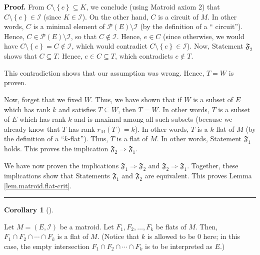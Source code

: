 \documentclass[numbers=enddot,12pt,final,onecolumn,notitlepage]{scrartcl}%
\theoremstyle{definition}
\newtheorem{coro}[theo]{Corollary}
\newenvironment{corollary}[1][]
{\begin{coro}[#1]\begin{leftbar}}
{\end{leftbar}\end{coro}}
\newenvironment{proof}[1][Proof]{\noindent\textbf{#1.} }{\ \rule{0.5em}{0.5em}}
\begin{document}
\begin{proof}
From $C\setminus\left\{  e\right\}  \subseteq K$, we conclude (using Matroid
axiom 2) that $C\setminus\left\{  e\right\}  \in\mathcal{I}$ (since
$K\in\mathcal{I}$). On the other hand, $C$ is a circuit of $M$. In other
words, $C$ is a minimal element of $\mathcal{P}\left(  E\right)
\setminus\mathcal{I}$ (by the definition of a \textquotedblleft
circuit\textquotedblright). Hence, $C\in\mathcal{P}\left(  E\right)
\setminus\mathcal{I}$, so that $C\notin\mathcal{I}$. Hence, $e\in C$ (since
otherwise, we would have $C\setminus\left\{  e\right\}  =C\notin\mathcal{I}$,
which would contradict $C\setminus\left\{  e\right\}  \in\mathcal{I}$). Now,
Statement $\mathfrak{F}_{2}$ shows that $C\subseteq T$. Hence, $e\in
C\subseteq T$, which contradicts $e\notin T$.

This contradiction shows that our assumption was wrong. Hence, $T=W$ is proven.

Now, forget that we fixed $W$. Thus, we have shown that if $W$ is a subset of
$E$ which has rank $k$ and satisfies $T\subseteq W$, then $T=W$. In other
words, $T$ is a subset of $E$ which has rank $k$ and is maximal among all such
subsets (because we already know that $T$ has rank $r_{M}\left(  T\right)
=k$). In other words, $T$ is a $k$-flat of $M$ (by the definition of a
\textquotedblleft$k$-flat\textquotedblright). Thus, $T$ is a flat of $M$. In
other words, Statement $\mathfrak{F}_{1}$ holds. This proves the implication
$\mathfrak{F}_{2}\Longrightarrow\mathfrak{F}_{1}$.

We have now proven the implications $\mathfrak{F}_{1}\Longrightarrow
\mathfrak{F}_{2}$ and $\mathfrak{F}_{2}\Longrightarrow\mathfrak{F}_{1}$.
Together, these implications show that Statements $\mathfrak{F}_{1}$ and
$\mathfrak{F}_{2}$ are equivalent. This proves Lemma
\ref{lem.matroid.flat-crit}.
\end{proof}

\begin{corollary}
\label{cor.matroid.flat-cap}Let $M=\left(  E,\mathcal{I}\right)  $ be a
matroid. Let $F_{1},F_{2},\ldots,F_{k}$ be flats of $M$. Then, $F_{1}\cap
F_{2}\cap\cdots\cap F_{k}$ is a flat of $M$. (Notice that $k$ is allowed to be
$0$ here; in this case, the empty intersection $F_{1}\cap F_{2}\cap\cdots\cap
F_{k}$ is to be interpreted as $E$.)
\end{corollary}
\end{document}
